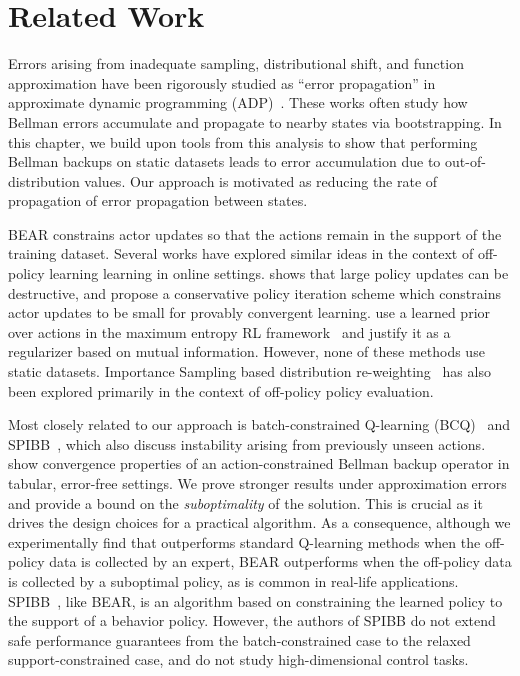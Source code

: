 \vspace{-0.2cm}
\section{Related Work}
\label{sec:related}
\vspace{-0.2cm}

Errors arising from inadequate sampling, distributional shift, and function approximation have been rigorously studied as ``error propagation'' in approximate dynamic programming (ADP)~\citep{bertsekas1996ndp,munos2003errorapi,farahmand2010error,bruno2015approximate}. These works often study how Bellman errors accumulate and propagate to nearby states via bootstrapping. In this chapter, we build upon tools from this analysis to show that performing Bellman backups on static datasets leads to error accumulation due to out-of-distribution values. Our approach is motivated as reducing the rate of propagation of error propagation between states.

BEAR constrains actor updates so that the actions remain in the support of the training dataset. Several works have explored similar ideas in the context of off-policy learning learning in online settings. \citet{kakade2002cpi} shows that large policy updates can be destructive, and propose a conservative policy iteration scheme which constrains actor updates to be small for provably convergent learning. \citet{grau-moya2018soft} use a learned prior over actions in the maximum entropy RL framework~\citep{levine2018rlasinference} and justify it as a regularizer based on mutual information. However, none of these methods use static datasets. Importance Sampling based distribution re-weighting~\cite{munos2016safe,gelada2019off,precup2001offpol,mahmood2015emphatic} has also been explored primarily in the context of off-policy policy evaluation.

Most closely related to our approach is batch-constrained Q-learning (BCQ)~\citep{fujimoto2018off} and SPIBB~\citep{laroche2019spibb}, which also discuss instability arising from previously unseen actions. \citet{fujimoto2018off} show convergence properties of an action-constrained Bellman backup operator in tabular, error-free settings. We prove stronger results under approximation errors and provide a bound on the \emph{suboptimality} of the solution. This is crucial as it drives the design choices for a practical algorithm. As a consequence, although we experimentally find that \citep{fujimoto2018off} outperforms standard Q-learning methods when the off-policy data is collected by an expert, BEAR outperforms \cite{fujimoto2018off} when the off-policy data is collected by a suboptimal policy, as is common in real-life applications. SPIBB~\citep{laroche2019spibb}, like BEAR, is an algorithm based on constraining the learned policy to the support of a behavior policy. However, the authors of SPIBB do not extend safe performance guarantees from the batch-constrained case to the relaxed support-constrained case, and do not study high-dimensional control tasks. 
